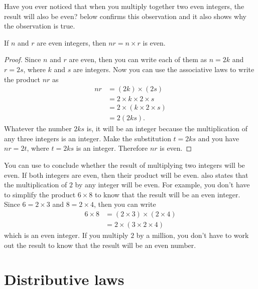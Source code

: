 \documentclass[a4paper,oneside,12pt]{article}
\begin{document}
Have you ever noticed that when you multiply together two even
integers, the result will also be even?
 below confirms this
observation and it also shows why the observation is true.

\begin{theorem}
\label{thm:product_of_two_evens_is_even}
If $n$ and $r$ are even integers, then $nr = n \times r$ is even.
\end{theorem}

\begin{proof}
Since $n$ and $r$ are even, then you can write each of them as
$n = 2k$ and $r = 2s$, where $k$ and $s$ are integers.  Now you can
use the associative laws to write the product $nr$ as
\begin{align*}
nr
&=
(2k) \times (2s) \\[4pt]
&=
2 \times k \times 2 \times s \\[4pt]
&=
2 \times (k \times 2 \times s) \\[4pt]
&=
2 (2ks).
\end{align*}
Whatever the number $2ks$ is, it will be an integer because the
multiplication of any three integers is an integer.  Make the
substitution $t = 2ks$ and you have $nr = 2t$, where $t = 2ks$ is an
integer.  Therefore $nr$ is even.
\end{proof}

You can use  to conclude
whether the result of multiplying two integers will be even.  If both
integers are even, then their product will be even.
 also states that the
multiplication of $2$ by any integer will be even. For example, you
don't have to simplify the product $6 \times 8$ to know that the
result will be an even integer.  Since $6 = 2 \times 3$ and
$8 = 2 \times 4$, then you can write
\begin{align*}
6 \times 8
&= (2 \times 3) \times (2 \times 4) \\[4pt]
&=
2 \times (3 \times 2 \times 4)
\end{align*}
which is an even integer.  If you multiply $2$ by a million, you don't
have to work out the result to know that the result will be an even
number.



\section{Distributive laws}
\end{document}
